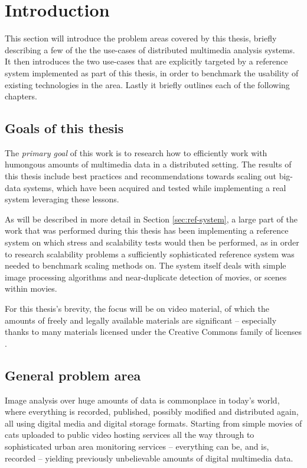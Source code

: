 \chapter{Introduction}
\label{cha:intro}

This section will introduce the problem areas covered by this thesis, briefly describing a few of the the use-cases of distributed multimedia analysis systems. It then introduces the two use-cases that are explicitly targeted by a reference system implemented as part of this thesis, in order to benchmark the usability of existing technologies in the area. Lastly it briefly outlines each of the following chapters.


\section{Goals of this thesis}
The \textit{primary goal} of this work is to research how to efficiently work with humongous amounts of multimedia data in a distributed setting. The results of this thesis include best practices and recommendations towards scaling out big-data systems, which have been acquired and tested while implementing a real system leveraging these lessons. 

As will be described in more detail in Section \ref{sec:ref-system}, a large part of the work that was performed during this thesis has been implementing a reference system on which stress and scalability tests would then be performed, as in order to research scalability problems a sufficiently sophisticated reference system was needed to benchmark scaling methods on. The system itself deals with simple image processing algorithms and near-duplicate detection of movies, or scenes within movies.

For this thesis's brevity, the focus will be on video material, of which the amounts of freely and legally  available materials are significant -- especially thanks to many materials licensed under the Creative Commons family of licenses \cite{creative-commons}.


\section{General problem area}
Image analysis over huge amounts of data is commonplace in today's world, where everything is recorded, published, possibly modified and distributed again, all using digital media and digital storage formats. Starting from simple movies of cats uploaded to public video hosting services all the way through to sophisticated urban area monitoring services -- everything can be, and is, recorded -- yielding previously unbelievable amounts of digital multimedia data.

